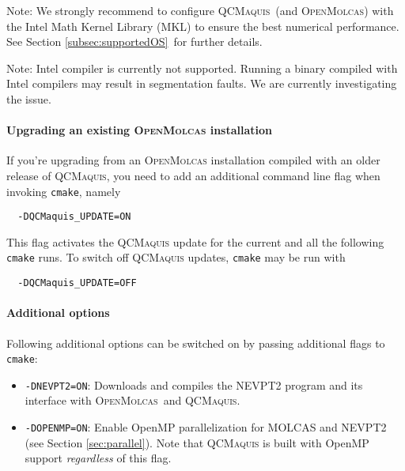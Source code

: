 \documentclass[bibliography=totoc,12pt,a4paper]{scrartcl}
\newcommand{\mol}{\textsc{OpenMolcas}}
\newcommand{\qcm}{\textsc{QCMaquis}}
\begin{document}
\begin{framed}
	\noindent\large{Note: We strongly recommend to configure \qcm\ (and \mol) with the Intel Math Kernel Library (MKL) to ensure the best numerical performance. See Section \ref{subsec:supportedOS}\ for further details.}
\end{framed}
\begin{framed}
 \noindent Note: Intel compiler is currently not supported. Running a binary compiled with Intel compilers may result in segmentation faults. We are currently investigating the issue.
\end{framed}

\paragraph{Upgrading an existing \mol{} installation}\label{sec:build-upgrade}$\;$\\

If you're upgrading from an \mol{} installation compiled with an older release of \qcm{}, you need to add an additional command line flag when invoking \texttt{cmake}, namely
\begin{verbatim}
  -DQCMaquis_UPDATE=ON
\end{verbatim}

This flag activates the \qcm{} update for the current and all the following \texttt{cmake} runs. To switch off \qcm{} updates, \texttt{cmake} may be run with
\begin{verbatim}
  -DQCMaquis_UPDATE=OFF
\end{verbatim}




\paragraph{Additional options}$\;$\\
Following additional options can be switched on by passing additional flags to \texttt{cmake}:
\begin{itemize}
 \item \texttt{-DNEVPT2=ON}: Downloads and compiles the NEVPT2 program and its interface with \mol\ and \qcm.
 \item \texttt{-DOPENMP=ON}: Enable OpenMP parallelization for MOLCAS and NEVPT2 (see Section \ref{sec:parallel}). Note that \qcm{} is built with OpenMP support \emph{regardless} of this flag.
\end{itemize}
\end{document}

